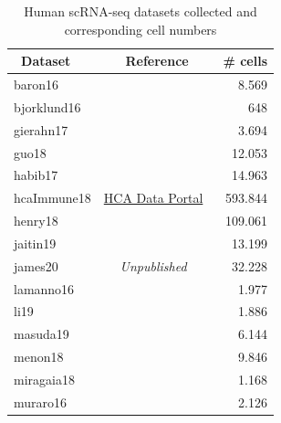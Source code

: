 \begin{table}[ht!] %
\normalsize
\caption[Human scRNA-seq datasets collected and corresponding cell numbers]{Human scRNA-seq datasets collected and corresponding cell numbers}
\centering
\label{table:tab_humancells}

\begin{tabular}{l|c|r}
\toprule
~\textbf{Dataset} & ~\textbf{Reference} & ~\textbf{\# cells} \\
\midrule
baron16 & ~\citep{baron_single-cell_2016} & 8.569  \\

bjorklund16 & ~\citep{bjorklund_heterogeneity_2016} & 648  \\

gierahn17 & ~\citep{gierahn_seq-well:_2017} & 3.694  \\

guo18 & ~\citep{guo_adult_2018} & 12.053  \\

habib17 & ~\citep{habib_massively_2017} & 14.963  \\

hcaImmune18 & \href{data.humancellatlas.org}{HCA Data Portal} & 593.844  \\

henry18 & ~\citep{henry_cellular_2018} & 109.061  \\

jaitin19 & ~\citep{jaitin_lipid-associated_2019} & 13.199  \\

james20 & \textit{Unpublished} & 32.228  \\

lamanno16 & ~\citep{la_manno_molecular_2016} & 1.977  \\

li19 & ~\citep{li_memory_2019} & 1.886  \\

masuda19 & ~\citep{masuda_spatial_2019} & 6.144  \\

menon18 & ~\citep{menon_single-cell_2018} & 9.846  \\

miragaia18 & ~\citep{miragaia_single-cell_2019} & 1.168  \\

muraro16 & ~\citep{muraro_single-cell_2016} & 2.126  \\


\end{tabular}
\end{table}
